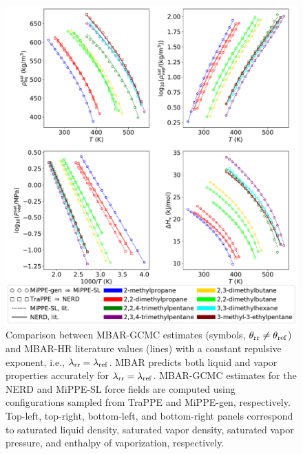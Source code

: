 \documentclass[journal=jced,manuscript=article]{achemso}
\begin{document}
	\begin{figure}[htb!]
		\centering
		\includegraphics[width=6.4in]{refFF_to_rrFF_lam_constant.pdf}
		\caption{Comparison between MBAR-GCMC estimates (symbols, $\theta_{\rm rr} \neq \theta_{\rm ref}$) and MBAR-HR literature values (lines) with a constant repulsive exponent, i.e., $\lambda_{\rm rr} = \lambda_{\rm ref}$. MBAR predicts both liquid and vapor properties accurately for $\lambda_{\rm rr} = \lambda_{\rm ref}$. MBAR-GCMC estimates for the NERD and MiPPE-SL force fields are computed using configurations sampled from TraPPE and MiPPE-gen, respectively. Top-left, top-right, bottom-left, and bottom-right panels correspond to saturated liquid density, saturated vapor density, saturated vapor pressure, and enthalpy of vaporization, respectively.}
		\label{fig:refFF_to_rrFF_lam_constant}
	\end{figure}
\end{document}
